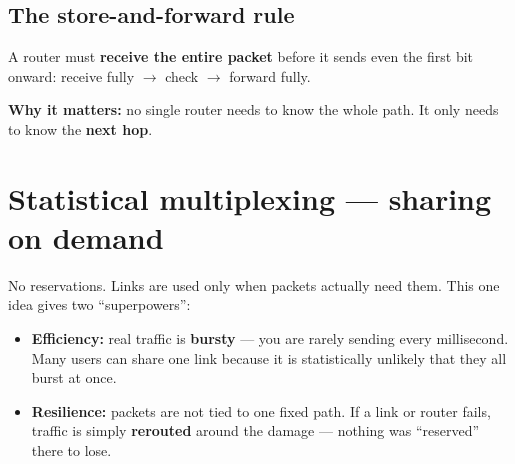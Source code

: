 \begin{center}
\end{center}

\subsection{The store-and-forward rule}
A router must \textbf{receive the entire packet} before it sends even the first bit onward: receive fully $\to$ check $\to$ forward fully.

\begin{center}
\end{center}

\textbf{Why it matters:} no single router needs to know the whole path. It only needs to know the \textbf{next hop}.

\section{Statistical multiplexing --- sharing on demand}

No reservations. Links are used only when packets actually need them. This one idea gives two ``superpowers'':

\begin{itemize}
  \item \textbf{Efficiency:} real traffic is \textbf{bursty} --- you are rarely sending every millisecond. Many users can share one link because it is statistically unlikely that they all burst at once.
  \item \textbf{Resilience:} packets are not tied to one fixed path. If a link or router fails, traffic is simply \textbf{rerouted} around the damage --- nothing was ``reserved'' there to lose.
\end{itemize}

